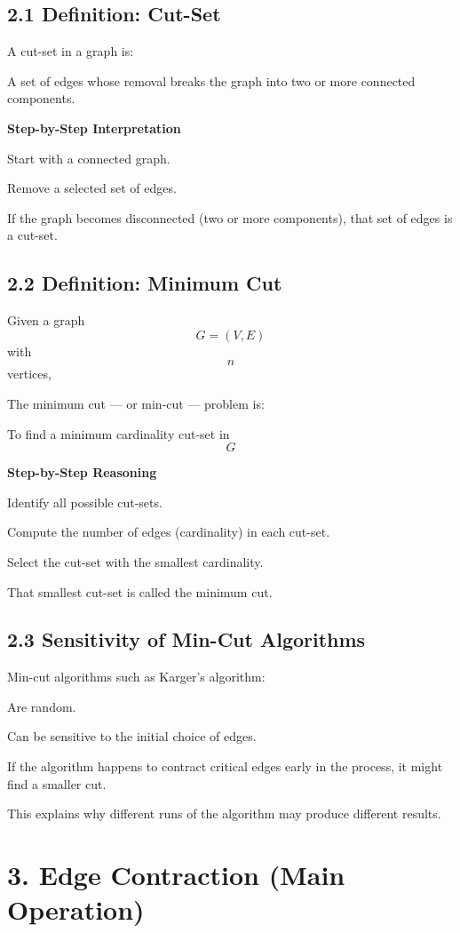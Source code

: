 \documentclass[11pt]{article}
\begin{document}
\subsection*{2.1 Definition: Cut-Set}

A cut-set in a graph is:

A set of edges whose removal breaks the graph into two or more connected components.

\textbf{Step-by-Step Interpretation}

Start with a connected graph.

Remove a selected set of edges.

If the graph becomes disconnected (two or more components), that set of edges is a cut-set.

\subsection*{2.2 Definition: Minimum Cut}

Given a graph
\[
G = (V,E)
\]
with
\[
n
\]
vertices,

The minimum cut — or min-cut — problem is:

To find a minimum cardinality cut-set in
\[
G
\]

\textbf{Step-by-Step Reasoning}

Identify all possible cut-sets.

Compute the number of edges (cardinality) in each cut-set.

Select the cut-set with the smallest cardinality.

That smallest cut-set is called the minimum cut.

\subsection*{2.3 Sensitivity of Min-Cut Algorithms}

Min-cut algorithms such as Karger’s algorithm:

Are random.

Can be sensitive to the initial choice of edges.

If the algorithm happens to contract critical edges early in the process, it might find a smaller cut.

This explains why different runs of the algorithm may produce different results.

\section*{3. Edge Contraction (Main Operation)}
\end{document}
